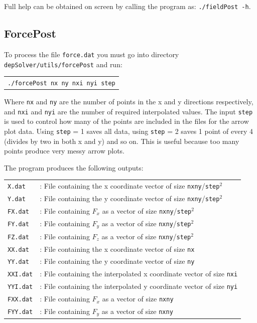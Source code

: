 \documentclass[12pt]{article}
\begin{document}
Full help can be obtained on screen by calling the program as: \texttt{./fieldPost -h}.

\subsection{ForcePost}
To process the file \verb+force.dat+ you must go into directory \verb+depSolver/utils/forcePost+ and run:

\begin{tabular}{l}
\texttt{./forcePost nx ny nxi nyi step}
\end{tabular}

Where \verb+nx+ and \verb+ny+ are the number of points in the x and y directions respectively, and \verb+nxi+ and \verb+nyi+ are the number of required interpolated values. The input \verb+step+ is used to control how many of the points are included in the files for the arrow plot data. Using \verb+step+ = 1 saves all data, using \verb+step+ = 2 saves 1 point of every 4 (divides by two in both x and y) and so on. This is useful because too many points produce very messy arrow plots.

The program produces the following outputs:

\begin{tabular}{ll}
\texttt{X.dat} &: File containing the x coordinate vector of size \verb+nx+\verb+ny+/\verb+step+$^2$\\
\texttt{Y.dat} &: File containing the y coordinate vector of size \verb+nx+\verb+ny+/\verb+step+$^2$\\
\texttt{FX.dat} &: File containing $F_x$ as a vector of size \verb+nx+\verb+ny+/\verb+step+$^2$\\
\texttt{FY.dat} &: File containing $F_y$ as a vector of size \verb+nx+\verb+ny+/\verb+step+$^2$\\
\texttt{FZ.dat} &: File containing $F_z$ as a vector of size \verb+nx+\verb+ny+/\verb+step+$^2$\\
\texttt{XX.dat} &: File containing the x coordinate vector of size \verb+nx+\\
\texttt{YY.dat} &: File containing the y coordinate vector of size \verb+ny+\\
\texttt{XXI.dat} &: File containing the interpolated x coordinate vector of size \verb+nxi+\\
\texttt{YYI.dat} &: File containing the interpolated y coordinate vector of size \verb+nyi+\\
\texttt{FXX.dat} &: File containing $F_x$ as a vector of size \verb+nx+\verb+ny+\\
\texttt{FYY.dat} &: File containing $F_y$ as a vector of size \verb+nx+\verb+ny+\\
\end{tabular}
\end{document}
